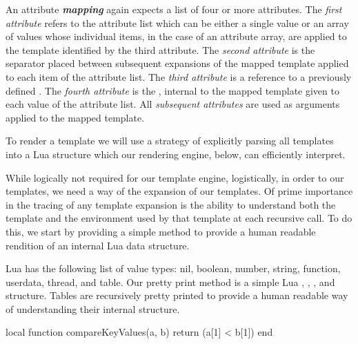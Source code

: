An attribute \emph{\bf mapping} again expects a list of four or more 
attributes. The \emph{first attribute} refers to the attribute list which 
can be either a single value or an array of values whose individual items, 
in the case of an attribute array, are applied to the template identified 
by the third attribute. The \emph{second attribute} is the separator 
placed between subsequent expansions of the mapped template applied to 
each item of the attribute list. The \emph{third attribute} is a reference 
to a previously defined . The \emph{fourth 
attribute} is the , internal to the mapped template given to 
each value of the attribute list. All \emph{subsequent attributes} are 
used as arguments applied to the mapped template. 

To render a template we will use a strategy of explicitly parsing all 
templates into a Lua structure which our rendering engine, below, can 
efficiently interpret.

\startTestSuite[prettyPrint]

While logically not required for our template engine, logistically, in 
order to  our templates, we need a way of  the 
expansion of our templates. Of prime importance in the tracing of any 
template expansion is the ability to understand both the template and the 
environment used by that template at each recursive call. To do this, we 
start by providing a simple  method to provide a human 
readable rendition of an internal Lua data structure. 

Lua has the following list of value types: nil, boolean, number, string, 
function, userdata, thread, and table. Our pretty print method is a simple 
Lua , , , and  structure. 
Tables are recursively pretty printed to provide a human readable way of 
understanding their internal structure. 

\startLuaCode
local function compareKeyValues(a, b)
  return (a[1] < b[1])
end


